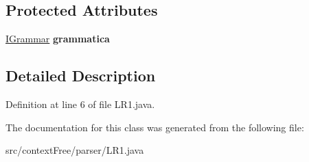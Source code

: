 \subsection*{Protected Attributes}
\begin{DoxyCompactItemize}
\item 
\hypertarget{classcontext_free_1_1parser_1_1_l_r1_a1639494e6b5ede7a4e9b6e4c24fd1702}{\hyperlink{interfacecontext_free_1_1grammar_1_1_i_grammar}{I\-Grammar} {\bfseries grammatica}}\label{classcontext_free_1_1parser_1_1_l_r1_a1639494e6b5ede7a4e9b6e4c24fd1702}

\end{DoxyCompactItemize}


\subsection{Detailed Description}


Definition at line 6 of file L\-R1.\-java.



The documentation for this class was generated from the following file\-:\begin{DoxyCompactItemize}
\item 
src/context\-Free/parser/L\-R1.\-java\end{DoxyCompactItemize}
